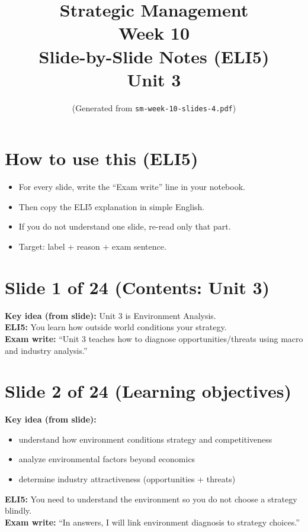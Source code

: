 \documentclass[11pt,a4paper]{article}
\title{Strategic Management \\ Week 10 \\ Slide-by-Slide Notes (ELI5) \\ Unit 3}
\author{(Generated from \texttt{sm-week-10-slides-4.pdf})}
\date{}
\begin{document}
\maketitle

\section*{How to use this (ELI5)}
\begin{itemize}
  \item For every slide, write the ``Exam write'' line in your notebook.
  \item Then copy the ELI5 explanation in simple English.
  \item If you do not understand one slide, re-read only that part.
  \item Target: label + reason + exam sentence.
\end{itemize}

\section*{Slide 1 of 24 (Contents: Unit 3)}
\textbf{Key idea (from slide):} Unit 3 is Environment Analysis.\\
\textbf{ELI5:} You learn how outside world conditions your strategy.\\
\textbf{Exam write:} ``Unit 3 teaches how to diagnose opportunities/threats using macro and industry analysis.''

\section*{Slide 2 of 24 (Learning objectives)}
\textbf{Key idea (from slide):}
\begin{itemize}
  \item understand how environment conditions strategy and competitiveness
  \item analyze environmental factors beyond economics
  \item determine industry attractiveness (opportunities + threats)
\end{itemize}
\textbf{ELI5:} You need to understand the environment so you do not choose a strategy blindly.\\
\textbf{Exam write:} ``In answers, I will link environment diagnosis to strategy choices.''

\end{document}
